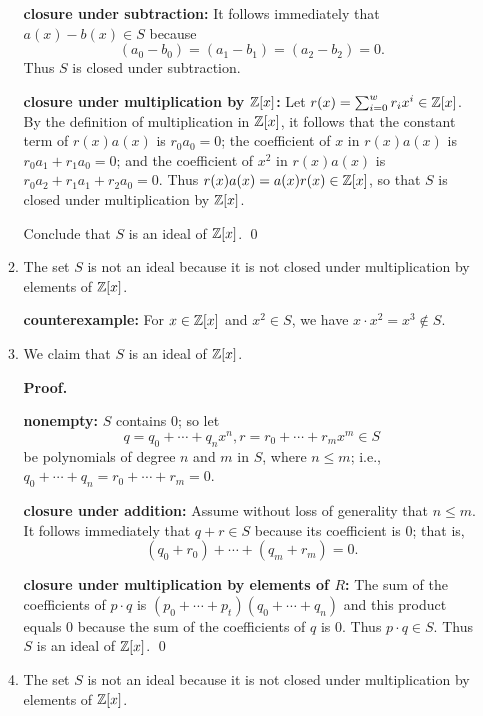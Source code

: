 \begin{enumerate}
\begin{enumerate}
               \textbf{closure under subtraction:} It follows immediately that
               $a(x) - b(x) \in S$ because
               $$(a_0 - b_0) = (a_1 - b_1) = (a_2 - b_2) = 0.$$
               Thus $S$ is closed under subtraction.

               \textbf{closure under multiplication by $\mathbb{Z}[x]$:} Let
               $r(x) = \sum_{i=0}^wr_ix^i \in \mathbb{Z}[x]$. By the definition of
               multiplication in $\mathbb{Z}[x]$, it follows that the constant term of
               $r(x)a(x)$ is $r_0a_0 = 0$; the coefficient of $x$ in $r(x)a(x)$ 
               is $r_0a_1 + r_1a_0 = 0$; and the coefficient of $x^2$ in
               $r(x)a(x)$ is $r_0a_2 + r_1a_1 + r_2a_0 = 0$. Thus
               $r(x)a(x) = a(x)r(x) \in \mathbb{Z}[x]$, so that $S$ is closed under
               multiplication by $\mathbb{Z}[x]$.

               Conclude that $S$ is an ideal of $\mathbb{Z}[x]$. \qed
         \item The set $S$ is not an ideal because it is not closed under
               multiplication by elements of $\mathbb{Z}[x]$.

               \textbf{counterexample:} For $x \in \mathbb{Z}[x]$ and $x^2 \in S$, we
               have $x \cdot x^2 = x^3 \notin S$.
         \item We claim that $S$ is an ideal of $\mathbb{Z}[x]$.

               \textbf{Proof.} 

               \textbf{nonempty:} $S$ contains 0; so let
               $$q = q_0 + \cdots + q_nx^n, r = r_0 + \cdots + r_mx^m \in S$$
               be polynomials of degree $n$ and $m$ in $S$, where $n \le m$;
               i.e., $q_0 + \cdots + q_n = r_0 + \cdots + r_m = 0$.

               \textbf{closure under addition:} Assume without loss of
               generality that $n \le m$. It follows immediately that
               $q + r \in S$ because its coefficient is 0; that is,
               $$(q_0 + r_0) + \cdots + (q_m + r_m) = 0.$$

               \textbf{closure under multiplication by elements of $R$:} The
               sum of the coefficients of $p \cdot q$ is
               $(p_0 + \cdots + p_t)(q_0 + \cdots + q_n)$ and this product
               equals 0 because the sum of the coefficients of $q$ is 0. Thus
               $p \cdot q \in S$. Thus $S$ is an ideal of $\mathbb{Z}[x]$. \qed
         \item The set $S$ is not an ideal because it is not closed under
               multiplication by elements of $\mathbb{Z}[x]$.


\end{enumerate}
\end{enumerate}
